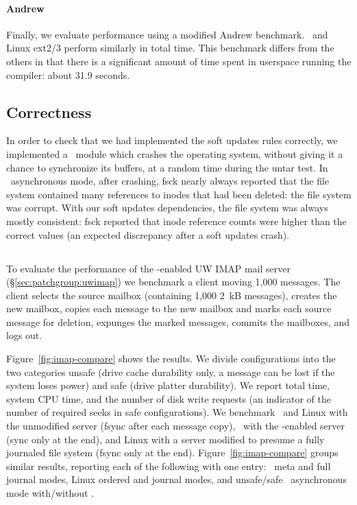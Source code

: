 \paragraph{Andrew}
%
Finally, we evaluate performance using a modified Andrew benchmark.
\Kudos\ and Linux ext2/3 perform similarly in total time. This benchmark
differs from the others in that there is a significant amount of time spent
in userspace running the compiler: about 31.9 seconds.

\subsection {Correctness}
\label{sec:eval:correctness}

In order to check that we had implemented the soft updates rules correctly, we
implemented a \Kudos\ module which crashes the operating system, without
giving it a chance to synchronize its buffers, at a random time during the
untar test.
%
In \Kudos\ asynchronous mode, after crashing, fsck nearly always reported that
the file system contained many references to inodes that had been deleted: the
file system was corrupt.
%
With our soft updates dependencies, the file system was always mostly
consistent: fsck reported that inode reference counts were higher than the
correct values (an expected discrepancy after a soft updates crash).

\subsection {\Patchgroups}
\label{sec:evaluation:uwimap}


To evaluate the performance of the \patchgroup-enabled UW IMAP mail
server (\S\ref{sec:patchgroup:uwimap}) we benchmark a client moving
1,000 messages. The client selects the source mailbox (containing
1,000 2~kB messages), creates the new mailbox, copies each message to
the new mailbox and marks each source message for deletion, expunges
the marked messages, commits the mailboxes, and logs out.

Figure~\ref{fig:imap-compare} shows the results.
%
We divide configurations into the two categories unsafe (drive cache
durability only, a message can be lost if the system loses power) and safe
(drive platter durability).
%
We report total time, system CPU time, and the number of disk write
requests (an indicator of the number of required seeks in safe
configurations).
%
We benchmark
%
\Kudos\ and Linux with the unmodified server (fsync after each message
copy),
%
\Kudos\ with the \patchgroup-enabled server (sync only at the end),
%
and Linux with a server modified to presume a fully journaled file
system (fsync only at the end).
%
Figure~\ref{fig:imap-compare} groups similar results, reporting each
of the following with one entry:
%
\Kudos\ meta and full journal modes,
%
Linux ordered and journal modes,
%
and unsafe/safe \Kudos\ asynchronous mode with/without \patchgroups.

